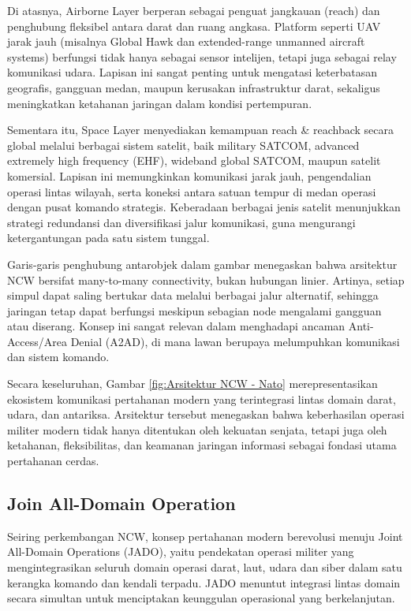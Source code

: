 Di atasnya, Airborne Layer berperan sebagai penguat jangkauan (reach) dan penghubung fleksibel antara darat dan ruang angkasa.
Platform seperti UAV jarak jauh (misalnya Global Hawk dan extended-range unmanned aircraft systems) berfungsi tidak hanya sebagai sensor intelijen, tetapi juga sebagai relay komunikasi udara.
Lapisan ini sangat penting untuk mengatasi keterbatasan geografis, gangguan medan, maupun kerusakan infrastruktur darat, sekaligus meningkatkan ketahanan jaringan dalam kondisi pertempuran.

Sementara itu, Space Layer menyediakan kemampuan reach \& reachback secara global melalui berbagai sistem satelit, baik military SATCOM, advanced extremely high frequency (EHF), wideband global SATCOM, maupun satelit komersial.
Lapisan ini memungkinkan komunikasi jarak jauh, pengendalian operasi lintas wilayah, serta koneksi antara satuan tempur di medan operasi dengan pusat komando strategis.
Keberadaan berbagai jenis satelit menunjukkan strategi redundansi dan diversifikasi jalur komunikasi, guna mengurangi ketergantungan pada satu sistem tunggal.

Garis-garis penghubung antarobjek dalam gambar menegaskan bahwa arsitektur NCW bersifat many-to-many connectivity, bukan hubungan linier.
Artinya, setiap simpul dapat saling bertukar data melalui berbagai jalur alternatif, sehingga jaringan tetap dapat berfungsi meskipun sebagian node mengalami gangguan atau diserang.
Konsep ini sangat relevan dalam menghadapi ancaman Anti-Access/Area Denial (A2AD), di mana lawan berupaya melumpuhkan komunikasi dan sistem komando.

Secara keseluruhan, Gambar \ref{fig:Arsitektur NCW - Nato} merepresentasikan ekosistem komunikasi pertahanan modern yang terintegrasi lintas domain darat, udara, dan antariksa.
Arsitektur tersebut menegaskan bahwa keberhasilan operasi militer modern tidak hanya ditentukan oleh kekuatan senjata, tetapi juga oleh ketahanan, fleksibilitas, dan keamanan jaringan informasi sebagai fondasi utama pertahanan cerdas.

\subsection{Join All-Domain Operation}
Seiring perkembangan NCW, konsep pertahanan modern berevolusi menuju Joint All-Domain Operations (JADO), yaitu pendekatan operasi militer yang mengintegrasikan seluruh domain operasi darat, laut, udara dan siber dalam satu kerangka komando dan kendali terpadu.
JADO menuntut integrasi lintas domain secara simultan untuk menciptakan keunggulan operasional yang berkelanjutan.

